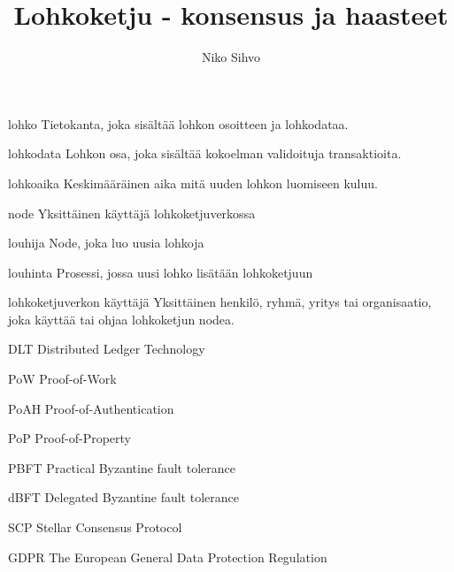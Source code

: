 \documentclass[utf8,bachelor]{gradu3}
\begin{document}
\title{Lohkoketju - konsensus ja haasteet}

\author{Niko Sihvo}


\maketitle


\begin{thetermlist}
\item[lohko] Tietokanta, joka sisältää lohkon osoitteen ja lohkodataa.
\item[lohkodata] Lohkon osa, joka sisältää kokoelman validoituja transaktioita.
\item[lohkoaika] Keskimääräinen aika mitä uuden lohkon luomiseen kuluu.
\item[node] Yksittäinen käyttäjä lohkoketjuverkossa
\item[louhija] Node, joka luo uusia lohkoja
\item[louhinta] Prosessi, jossa uusi lohko lisätään lohkoketjuun 
\item[lohkoketjuverkon käyttäjä] Yksittäinen henkilö, ryhmä, yritys tai organisaatio, joka käyttää tai ohjaa lohkoketjun nodea.
\item[DLT] Distributed Ledger Technology
\item[PoW] Proof-of-Work
\item[PoAH] Proof-of-Authentication
\item[PoP] Proof-of-Property
\item[PBFT] Practical Byzantine fault tolerance
\item[dBFT] Delegated Byzantine fault tolerance
\item[SCP] Stellar Consensus Protocol
\item[GDPR] The European General Data Protection Regulation
\end{thetermlist}
\end{document}
